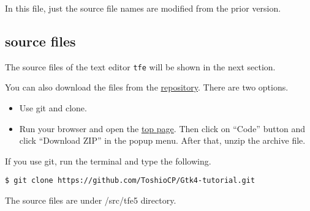 In this file, just the source file names are modified from the prior
version.

\hypertarget{source-files}{%
\subsection{source files}\label{source-files}}

The source files of the text editor \passthrough{\lstinline!tfe!} will
be shown in the next section.

You can also download the files from the
\href{https://github.com/ToshioCP/Gtk4-tutorial}{repository}. There are
two options.

\begin{itemize}
\tightlist
\item
  Use git and clone.
\item
  Run your browser and open the
  \href{https://github.com/ToshioCP/Gtk4-tutorial}{top page}. Then click
  on ``Code'' button and click ``Download ZIP'' in the popup menu. After
  that, unzip the archive file.
\end{itemize}

If you use git, run the terminal and type the following.

\begin{lstlisting}
$ git clone https://github.com/ToshioCP/Gtk4-tutorial.git
\end{lstlisting}

The source files are under /src/tfe5 directory.
